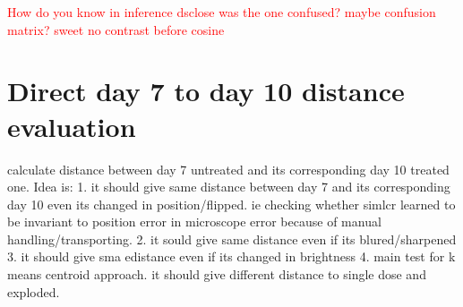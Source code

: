 \textcolor{red}{How do you know in inference dsclose was the one confused? maybe confusion matrix?  sweet no contrast before cosine}

\begin{table}[H]
    \centering
    \caption{Evaluation Results on Euclidean}
    \label{tab:professional_table}
\end{table}




\section{Direct day 7 to day 10 distance evaluation}\label{sec: distance}
calculate distance between day 7 untreated and its corresponding day 10 treated one.
Idea is:
1. it should give same distance between day 7 and its corresponding day 10
 even its changed in position/flipped. ie checking whether simlcr learned to 
 be invariant to position error in microscope error because of manual 
 handling/transporting.
2. it sould give same distance even if its blured/sharpened
3. it should give sma edistance even if its changed in brightness
4. main test for k means centroid approach. it should give different distance to single dose and exploded.


